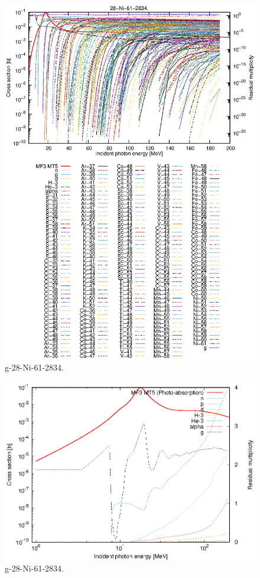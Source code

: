\begin{figure}
 \includegraphics[width=\linewidth]{eps/g_28-Ni-61_2834.eps}
  \caption{g-28-Ni-61-2834.}
\end{figure}
\newpage \clearpage

\begin{figure}
 \includegraphics[width=\linewidth]{eps-log/g_28-Ni-61_2834.eps}
 \caption{g-28-Ni-61-2834.}
\end{figure}
\newpage \clearpage

